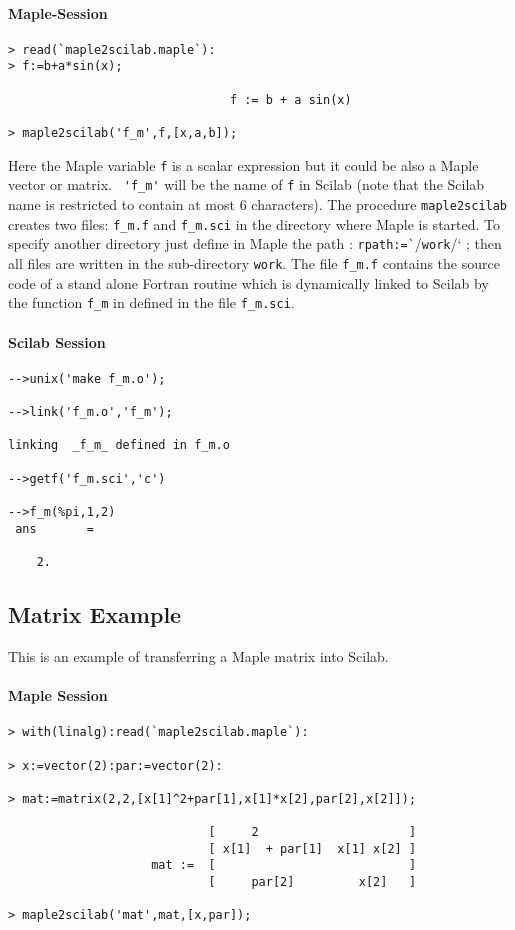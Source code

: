 \paragraph{Maple-Session}
\begin{verbatim}
> read(`maple2scilab.maple`):
> f:=b+a*sin(x);

                               f := b + a sin(x)

> maple2scilab('f_m',f,[x,a,b]);
\end{verbatim}
Here the Maple variable \verb!f! is a scalar expression but it could be also
a Maple vector or matrix.
\verb/ 'f_m'/ will be the name of \verb!f! in Scilab 
(note that the Scilab name is restricted to contain at most 6 characters).
The procedure \verb/maple2scilab/ creates two files: \verb/f_m.f/ 
and  \verb/f_m.sci/ in the directory where Maple is started.
To specify another directory just define in Maple the path : 
\verb/rpath:=`//\verb/work//` ; then all files are written in 
the sub-directory \verb/work/.
The file \verb!f_m.f! contains the source code of a stand alone Fortran
routine which is dynamically linked to Scilab by the function \verb!f_m! in
defined in the file \verb!f_m.sci!.

\paragraph{Scilab Session}
\begin{verbatim}
-->unix('make f_m.o');
 
-->link('f_m.o','f_m');

linking  _f_m_ defined in f_m.o  
 
-->getf('f_m.sci','c')
 
-->f_m(%pi,1,2)
 ans       =
 
    2.  
\end{verbatim}

\subsection{Matrix Example}
This is an example of transferring a Maple matrix into Scilab.
\paragraph{Maple Session}
\begin{verbatim}
> with(linalg):read(`maple2scilab.maple`):

> x:=vector(2):par:=vector(2):

> mat:=matrix(2,2,[x[1]^2+par[1],x[1]*x[2],par[2],x[2]]);

                            [     2                     ]
                            [ x[1]  + par[1]  x[1] x[2] ]
                    mat :=  [                           ]
                            [     par[2]         x[2]   ]

> maple2scilab('mat',mat,[x,par]);

\end{verbatim}

